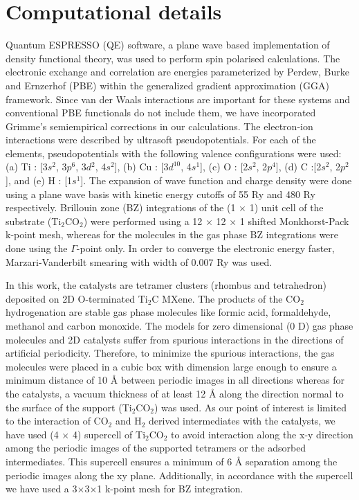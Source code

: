 \section{Computational details }
\label{compdettt}

Quantum ESPRESSO (QE) software\cite{QE2009}, a plane wave based implementation of density functional theory, was used to perform spin polarised calculations. The electronic exchange and correlation are energies parameterized by Perdew, Burke and Ernzerhof (PBE)\cite{GGA-PBE1996} within the generalized gradient approximation (GGA) framework. Since van der Waals interactions are important for these systems and conventional PBE functionals do not include them, we have incorporated Grimme's semiempirical corrections\cite{grimme2006semiempirical} in our calculations. The electron-ion interactions were described by ultrasoft pseudopotentials\cite{USPP1990}. For each of the elements, pseudopotentials with the following valence configurations were used: (a) Ti : [3$s{^2}$, 3$p{^6}$, 3$d{^2}$, 4$s{^2}$], (b) Cu : [3$d^{10}$, 4$s{^1}$], (c) O : [2$s{^2}$, 2$p{^4}$], (d) C :[2$s{^2}$, 2$p{^2}$], and (e) H : [1$s^1$]. The expansion of wave function and charge density were done using a plane wave basis with kinetic energy cutoffs of 55 Ry and 480 Ry respectively. Brillouin zone (BZ) integrations of the (1 $\times$ 1) unit cell of the substrate (Ti$_2$CO$_2$) were performed using a 12 $\times$ 12 $\times$ 1 shifted Monkhorst-Pack k-point mesh\cite{K-pointMP1976}, whereas for the molecules in the gas phase BZ integrations were done using the $\Gamma$-point only. In order to converge the electronic energy faster, Marzari-Vanderbilt smearing\cite{SmearingMV1999} with width of 0.007 Ry was used. 

In this work, the catalysts are tetramer clusters (rhombus and tetrahedron) deposited on 2D O-terminated Ti$_2$C MXene. The products of the CO$_2$ hydrogenation are stable gas phase molecules like formic acid, formaldehyde, methanol and carbon monoxide. The models for zero dimensional (0 D) gas phase molecules and 2D catalysts suffer from spurious interactions in the directions of artificial periodicity. Therefore, to minimize the spurious interactions, the gas molecules were placed in a cubic box with dimension large enough to ensure a minimum distance of 10 {\AA} between periodic images in all directions whereas for the catalysts, a vacuum thickness of at least 12 {\AA} along the direction normal to the surface of the support (Ti$_2$CO$_2$) was used. As our point of interest is limited to the interaction of CO$_2$ and H$_2$ derived intermediates with the catalysts, we have used (4 $\times$ 4) supercell of Ti$_2$CO$_2$ to avoid interaction along the x-y direction among the periodic images of the supported tetramers or the adsorbed intermediates. This supercell ensures a minimum of 6 {\AA} separation among the periodic images along the xy plane. Additionally, in accordance with the supercell we have used a 3$\times$3$\times$1 k-point mesh for BZ integration. 

